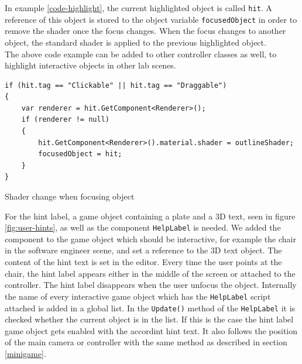 In example \ref{code-highlight}, the current highlighted object is called \texttt{hit}. A reference of this object is stored to the object variable \texttt{focusedObject} in order to remove the shader once the focus changes.
When the focus changes to another object, the standard shader is applied to the previous highlighted object.\\
The above code example can be added to other controller classes as well, to highlight interactive objects in other lab scenes.
\newpage
\begin{lstlisting} 
if (hit.tag == "Clickable" || hit.tag == "Draggable")
{
    var renderer = hit.GetComponent<Renderer>();
    if (renderer != null)
    {
        hit.GetComponent<Renderer>().material.shader = outlineShader;
        focusedObject = hit;
    }
}
\end{lstlisting} 
\caption{Shader change when focusing object}
\label{code-highlight}
For the hint label, a game object containing a plate and a 3D text, seen in figure \ref{fig:user-hints}, as well as the component \texttt{HelpLabel} is needed. We added the component to the game object which should be interactive, for example the chair in the software engineer scene, and set a reference to the 3D text object. The content of the hint text is set in the editor. Every time the user points at the chair, the hint label appears either in the middle of the screen or attached to the controller. The hint label disappears when the user unfocus the object. Internally the name of every interactive game object which has the \texttt{HelpLabel} script attached is added in a global list. In the \texttt{Update()} method of the \texttt{HelpLabel} it is checked whether the current object is in the list. If this is the case the hint label game object gets enabled with the accordint hint text. It also follows the position of  the main camera or controller with the same method as described in section \ref{minigame}.